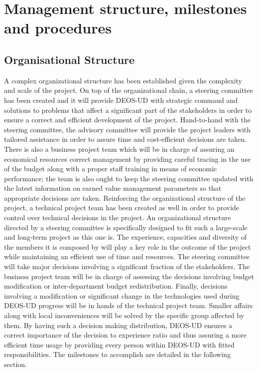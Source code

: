 \section{Management structure, milestones and procedures}

\subsection{Organisational Structure}

A complex organizational structure has been established given the complexity and scale of the project. On top of the organizational chain, a steering committee has been created and it will provide DEOS-UD with strategic command and solutions to problems that affect a significant part of the stakeholders in order to ensure a correct and efficient development of the project. Hand-to-hand with the steering committee, the advisory committee will provide the project leaders with tailored assistance in order to assure time and cost-efficient decisions are taken. There is also a business project team which will be in charge of assuring an economical resources correct management by providing careful tracing in the use of the budget along with a proper staff training in means of economic performance; the team is also ought to keep the steering committee updated with the latest information on earned value management parameters so that appropriate decisions are taken. Reinforcing the organizational structure of the project, a technical project team has been created as well in order to provide control over technical decisions in the project.
An organizational structure directed by a steering committee is specifically designed to fit such a large-scale and long-term project as this one is. The experience, capacities and diversity of the members it is composed by will play a key role in the outcome of the project while maintaining an efficient use of time and resources. The steering committee will take major decisions involving a significant fraction of the stakeholders. The business project team will be in charge of assessing the decisions involving budget modification or inter-department budget redistribution. Finally, decisions involving a modification or significant change in the technologies used during DEOS-UD progress will be in hands of the technical project team. Smaller affairs along with local inconveniences will be solved by the specific group affected by them. By having such a decision making distribution, DEOS-UD ensures a correct importance of the decision to experience ratio and thus assuring a more efficient time usage by providing every person within DEOS-UD with fitted responsibilities.
The milestones to accomplish are detailed in the following section.    

